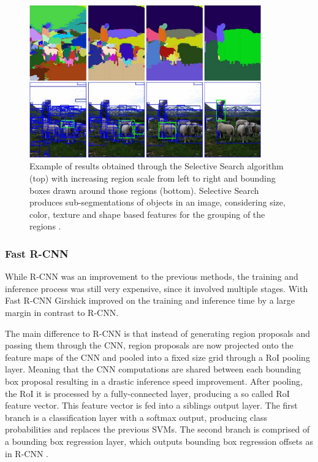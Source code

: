\begin{figure}
\begin{center}
    \includegraphics[width=10cm]{imgs/selective_search.png}
    \caption{Example of results obtained through the Selective Search algorithm (top) with increasing region scale from left to right and bounding boxes drawn around those regions (bottom). Selective Search produces sub-segmentations of objects in an image, considering size, color, texture and shape based features for the grouping of the regions \cite{selective_search}.}
    \label{fig:selective_search}
\end{center}
\end{figure}

\subsubsection{Fast R-CNN}
While \ac{R-CNN} was an improvement to the previous methods, the training and inference process was still very expensive, since it involved multiple stages.
With Fast R-CNN Girshick \cite{fast_rcnn} improved on the training and inference time by a large margin in contrast to \ac{R-CNN}.

The main difference to \ac{R-CNN} is that instead of generating region proposals and passing them through the \ac{CNN}, region proposals are now projected onto the feature maps of the \ac{CNN} and pooled into a fixed size grid through a \ac{RoI} pooling layer.
Meaning that the \ac{CNN} computations are shared between each bounding box proposal resulting in a drastic inference speed improvement.
After pooling, the \ac{RoI} it is processed by a fully-connected layer, producing a so called \ac{RoI} feature vector.
This feature vector is fed into a siblings output layer.
The first branch is a classification layer with a softmax output, producing class probabilities and replaces the previous \acp{SVM}.
The second branch is comprised of a bounding box regression layer, which outputs bounding box regression offsets as in \ac{R-CNN} \cite{rcnn}.

